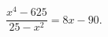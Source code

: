 \begin{ex}[type=equation]
	\begin{condition}
		$\dfrac{x^4 - 625}{25 - x^2} = 8x - 90.$
	\end{condition}
\end{ex}